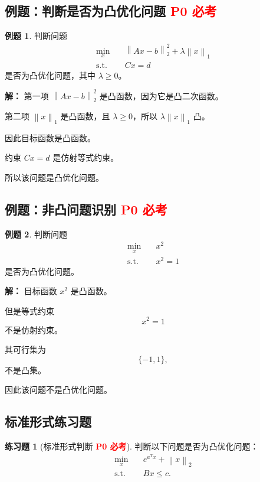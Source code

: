\documentclass[11pt,a4paper]{ctexart}
\newcommand{\st}{\text{s.t.}}
\newcommand{\norm}[1]{\left\lVert #1 \right\rVert}
\newcommand{\Pzero}{\textcolor{red}{\textbf{P0 必考}}}
\theoremstyle{definition}
\newtheorem{example}{例题}[section]
\newtheorem{exercise}{练习题}[section]
\theoremstyle{plain}
\theoremstyle{remark}
\begin{document}
\subsection{例题：判断是否为凸优化问题 \Pzero}

\begin{example}
判断问题
\[
\begin{aligned}
    \min_x\quad & \norm{Ax-b}_2^2+\lambda\norm{x}_1\\
    \st\quad & Cx=d
\end{aligned}
\]
是否为凸优化问题，其中 $\lambda\ge0$。

\textbf{解：}
第一项 $\norm{Ax-b}_2^2$ 是凸函数，因为它是凸二次函数。

第二项 $\norm{x}_1$ 是凸函数，且 $\lambda\ge0$，所以 $\lambda\norm{x}_1$ 凸。

因此目标函数是凸函数。

约束 $Cx=d$ 是仿射等式约束。

所以该问题是凸优化问题。
\end{example}

\subsection{例题：非凸问题识别 \Pzero}

\begin{example}
判断问题
\[
\begin{aligned}
    \min_x\quad & x^2\\
    \st\quad & x^2=1
\end{aligned}
\]
是否为凸优化问题。

\textbf{解：}
目标函数 $x^2$ 是凸函数。

但是等式约束
\[
    x^2=1
\]
不是仿射约束。

其可行集为
\[
    \{-1,1\},
\]
不是凸集。

因此该问题不是凸优化问题。
\end{example}

\subsection{标准形式练习题}

\begin{exercise}[标准形式判断 \Pzero]
判断以下问题是否为凸优化问题：
\[
\begin{aligned}
    \min_x\quad & e^{a^Tx}+ \norm{x}_2\\
    \st\quad & Bx\le c.
\end{aligned}
\]
\end{exercise}
\end{document}

